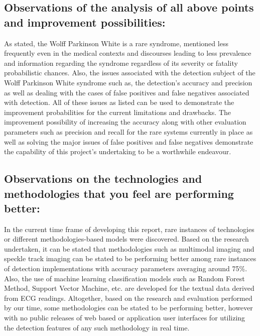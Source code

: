 \subsection*{Observations of the analysis of all above points and improvement possibilities:}  

As stated, the Wolff Parkinson White is a rare syndrome, mentioned less frequently even in the medical contexts and discourses leading to less prevalence and information regarding the syndrome regardless of its severity or fatality probabilistic chances. Also, the issues associated with the detection subject of the Wolff Parkinson White syndrome such as, the detection’s accuracy and precision as well as dealing with the cases of false positives and false negatives associated with detection. All of these issues as listed can be used to demonstrate the improvement probabilities for the current limitations and drawbacks. The improvement possibility of increasing the accuracy along with other evaluation parameters such as precision and recall for the rare systems currently in place as well as solving the major issues of false positives and false negatives demonstrate the capability of this project’s undertaking to be a worthwhile endeavour. 

\subsection*{Observations on the technologies and methodologies that you feel are performing better: }  

In the current time frame of developing this report, rare instances of technologies or different methodologies-based models were discovered. Based on the research undertaken, it can be stated that methodologies such as multimodal imaging and speckle track imaging can be stated to be performing better among rare instances of detection implementations with accuracy parameters averaging around 75\%. Also, the use of machine learning classification models such as Random Forest Method, Support Vector Machine, etc. are developed for the textual data derived from ECG readings. Altogether, based on the research and evaluation performed by our time, some methodologies can be stated to be performing better, however with no public releases of web based or application user interfaces for utilizing the detection features of any such methodology in real time. 


